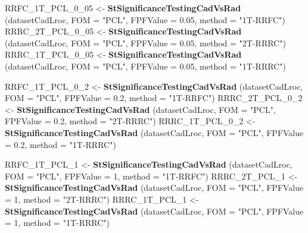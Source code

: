 \documentclass[
]{book}
\newenvironment{Shaded}{\begin{snugshade}}{\end{snugshade}}
\newcommand{\DataTypeTok}[1]{\textcolor[rgb]{0.13,0.29,0.53}{#1}}
\newcommand{\DecValTok}[1]{\textcolor[rgb]{0.00,0.00,0.81}{#1}}
\newcommand{\FloatTok}[1]{\textcolor[rgb]{0.00,0.00,0.81}{#1}}
\newcommand{\KeywordTok}[1]{\textcolor[rgb]{0.13,0.29,0.53}{\textbf{#1}}}
\newcommand{\NormalTok}[1]{#1}
\newcommand{\StringTok}[1]{\textcolor[rgb]{0.31,0.60,0.02}{#1}}
\begin{document}
\begin{Shaded}
\begin{Highlighting}[]


\NormalTok{RRFC_1T_PCL_}\DecValTok{0}\NormalTok{_}\DecValTok{05}\NormalTok{ <-}\StringTok{ }\KeywordTok{StSignificanceTestingCadVsRad}\NormalTok{ (datasetCadLroc, }
\DataTypeTok{FOM =} \StringTok{"PCL"}\NormalTok{, }\DataTypeTok{FPFValue =} \FloatTok{0.05}\NormalTok{, }\DataTypeTok{method =} \StringTok{"1T-RRFC"}\NormalTok{)}
\NormalTok{RRRC_2T_PCL_}\DecValTok{0}\NormalTok{_}\DecValTok{05}\NormalTok{ <-}\StringTok{ }\KeywordTok{StSignificanceTestingCadVsRad}\NormalTok{ (datasetCadLroc, }
\DataTypeTok{FOM =} \StringTok{"PCL"}\NormalTok{, }\DataTypeTok{FPFValue =} \FloatTok{0.05}\NormalTok{, }\DataTypeTok{method =} \StringTok{"2T-RRRC"}\NormalTok{)}
\NormalTok{RRRC_1T_PCL_}\DecValTok{0}\NormalTok{_}\DecValTok{05}\NormalTok{ <-}\StringTok{ }\KeywordTok{StSignificanceTestingCadVsRad}\NormalTok{ (datasetCadLroc, }
\DataTypeTok{FOM =} \StringTok{"PCL"}\NormalTok{, }\DataTypeTok{FPFValue =} \FloatTok{0.05}\NormalTok{, }\DataTypeTok{method =} \StringTok{"1T-RRRC"}\NormalTok{)}

\NormalTok{RRFC_1T_PCL_}\DecValTok{0}\NormalTok{_}\DecValTok{2}\NormalTok{ <-}\StringTok{ }\KeywordTok{StSignificanceTestingCadVsRad}\NormalTok{ (datasetCadLroc, }
\DataTypeTok{FOM =} \StringTok{"PCL"}\NormalTok{, }\DataTypeTok{FPFValue =} \FloatTok{0.2}\NormalTok{, }\DataTypeTok{method =} \StringTok{"1T-RRFC"}\NormalTok{)}
\NormalTok{RRRC_2T_PCL_}\DecValTok{0}\NormalTok{_}\DecValTok{2}\NormalTok{ <-}\StringTok{ }\KeywordTok{StSignificanceTestingCadVsRad}\NormalTok{ (datasetCadLroc, }
\DataTypeTok{FOM =} \StringTok{"PCL"}\NormalTok{, }\DataTypeTok{FPFValue =} \FloatTok{0.2}\NormalTok{, }\DataTypeTok{method =} \StringTok{"2T-RRRC"}\NormalTok{)}
\NormalTok{RRRC_1T_PCL_}\DecValTok{0}\NormalTok{_}\DecValTok{2}\NormalTok{ <-}\StringTok{ }\KeywordTok{StSignificanceTestingCadVsRad}\NormalTok{ (datasetCadLroc, }
\DataTypeTok{FOM =} \StringTok{"PCL"}\NormalTok{, }\DataTypeTok{FPFValue =} \FloatTok{0.2}\NormalTok{, }\DataTypeTok{method =} \StringTok{"1T-RRRC"}\NormalTok{)}

\NormalTok{RRFC_1T_PCL_}\DecValTok{1}\NormalTok{ <-}\StringTok{ }\KeywordTok{StSignificanceTestingCadVsRad}\NormalTok{ (datasetCadLroc, }
\DataTypeTok{FOM =} \StringTok{"PCL"}\NormalTok{, }\DataTypeTok{FPFValue =} \DecValTok{1}\NormalTok{, }\DataTypeTok{method =} \StringTok{"1T-RRFC"}\NormalTok{)}
\NormalTok{RRRC_2T_PCL_}\DecValTok{1}\NormalTok{ <-}\StringTok{ }\KeywordTok{StSignificanceTestingCadVsRad}\NormalTok{ (datasetCadLroc, }
\DataTypeTok{FOM =} \StringTok{"PCL"}\NormalTok{, }\DataTypeTok{FPFValue =} \DecValTok{1}\NormalTok{, }\DataTypeTok{method =} \StringTok{"2T-RRRC"}\NormalTok{)}
\NormalTok{RRRC_1T_PCL_}\DecValTok{1}\NormalTok{ <-}\StringTok{ }\KeywordTok{StSignificanceTestingCadVsRad}\NormalTok{ (datasetCadLroc, }
\DataTypeTok{FOM =} \StringTok{"PCL"}\NormalTok{, }\DataTypeTok{FPFValue =} \DecValTok{1}\NormalTok{, }\DataTypeTok{method =} \StringTok{"1T-RRRC"}\NormalTok{)}


\end{Highlighting}
\end{Shaded}
\end{document}
